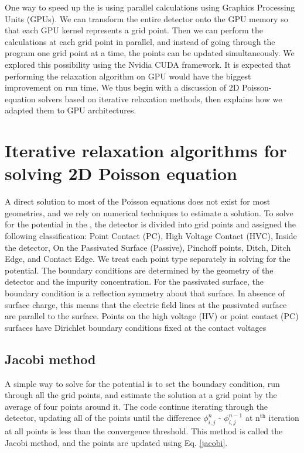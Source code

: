 One way to speed up the {\tdsim} is using parallel calculations using Graphics Processing Units (GPUs). We can transform the entire detector onto the GPU memory so that each GPU kernel represents a grid point. Then we can perform the calculations at each grid point in parallel, and instead of going through the program one grid point at a time, the points can be updated simultaneously. We explored this possibility using the Nvidia CUDA {\cpp} framework. It is expected that performing the relaxation algorithm on GPU would have the biggest improvement on run time. We thus begin with a discussion of 2D Poisson-equation solvers based on iterative relaxation methods, then explains how we adapted them to GPU architectures.

\section{Iterative relaxation algorithms for solving 2D Poisson equation}

A direct solution to most of the Poisson equations does not exist for most geometries, and we rely on numerical techniques to estimate a solution. To solve for the potential in the {\tdsim}, the detector is divided into grid points and assigned the following classification: Point Contact (PC), High Voltage Contact (HVC), Inside the detector, On the Passivated Surface (Passive), Pinchoff points, Ditch, Ditch Edge, and Contact Edge. We treat each point type separately in solving for the potential. The boundary conditions are determined by the geometry of the detector and the impurity concentration. For the passivated surface, the boundary condition is a reflection symmetry about that surface. In absence of surface charge, this means that the electric field lines at the passivated surface are parallel to the surface. Points on the high voltage (HV) or point contact (PC) surfaces have Dirichlet boundary conditions fixed at the contact voltages 

\subsection{Jacobi method}
A simple way to solve for the potential is to set the boundary condition, run through all the grid points, and estimate the solution at a grid point by the average of four points around it. The code continue iterating through the detector, updating all of the points until the difference $\phi_{i,j}^{n}$ - $\phi_{i,j}^{n-1}$ at n$^{\text{th}}$ iteration at all points is less than the convergence threshold. This method is called the Jacobi method, and the points are updated using Eq. \ref{jacobi}.


